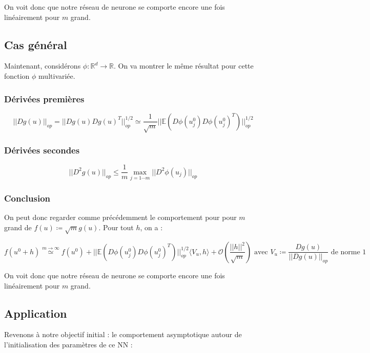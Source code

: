 \documentclass[a4paper, 11pt, french]{article}
\theoremstyle{definition}
\begin{document}
	On voit donc que notre réseau de neurone se comporte encore une fois linéairement pour $m$ grand. \\
	
	\subsection{Cas général}
	
	Maintenant, considérons $\phi : \mathbb{R}^d \to \mathbb{R}$. On va montrer le même résultat pour cette fonction $\phi$ multivariée.
	
	\subsubsection{Dérivées premières}
	
	\[||Dg(u)||_{op} = ||Dg(u)Dg(u)^T||_{op}^{1/2} \simeq \frac{1}{\sqrt{m}} ||\mathbb{E}(D \phi(u^0_j) D \phi(u^0_j)^T)||_{op}^{1/2}\]
	
	\subsubsection{Dérivées secondes}
	
	\[||D^2 g(u)||_{op} \leq \frac{1}{m} \max_{j=1\cdots m} ||D^2 \phi (u_j)||_{op}\]
	
	\subsubsection{Conclusion}

	On peut donc regarder comme précédemment le comportement pour pour $m$ grand de $f(u) \coloneqq \sqrt m g(u)$. Pour tout $h$, on a :
	
	\[ f(u^0 + h) \stackrel{m \to \infty}{\simeq} f(u^0) + ||\mathbb{E}(D \phi(u^0_j) D \phi(u^0_j)^T)||_{op}^{1/2} \langle V_u, h \rangle + \mathcal{O}\left(\frac{||h||^2}{\sqrt m}\right) \text{ avec $V_u \coloneqq \frac{D g(u)}{||D g(u)||_{op}}$ de norme 1} \]
		
	On voit donc que notre réseau de neurone se comporte encore une fois linéairement pour $m$ grand. \\

	\subsection{Application}
	
	Revenons à notre objectif initial : le comportement asymptotique autour de l'initialisation des paramètres de ce NN :
	
\end{document}
